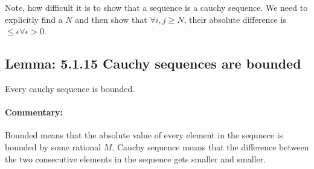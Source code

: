 \documentclass{report}
\begin{document}
Note, how difficult it is to show that a sequence is a cauchy sequence. We need to explicitly find a $N$ and then show that  $\forall i, j \ge N$, their absolute difference is  $\le \epsilon \forall \epsilon > 0$.

\subsection*{Lemma: 5.1.15 Cauchy sequences are bounded}
Every cauchy sequence is bounded. 
\paragraph{Commentary: } Bounded means that the absolute value of every element in the sequnece is bounded by some rational $M$. Cauchy sequence means that the difference between the two consecutive elements in the sequence gets smaller and smaller.
\end{document}
